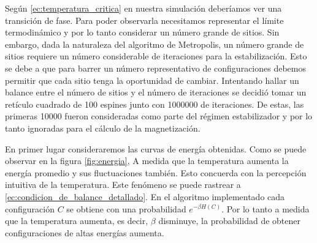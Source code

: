 \documentclass{article}
\begin{document}
Según \eqref{ec:temperatura_critica} en nuestra simulación deberíamos ver una transición de fase. Para poder observarla necesitamos representar el límite termodinámico y por lo tanto considerar un número grande de sitios. Sin embargo, dada la naturaleza del algoritmo de Metropolis, un número grande de sitios requiere un número considerable de iteraciones para la estabilización. Esto se debe a que para barrer un número representativo de configuraciones debemos permitir que cada sitio tenga la oportunidad de cambiar. Intentando hallar un balance entre el número de sitios y el número de iteraciones se decidió tomar un retículo cuadrado de 100 espines junto con 1000000 de iteraciones. De estas, las primeras 10000 fueron consideradas como parte del régimen estabilizador y por lo tanto ignoradas para el cálculo de la magnetización.

En primer lugar consideraremos las curvas de energía obtenidas. Como se puede observar en la figura \ref{fig:energia}, A medida que la temperatura aumenta la energía promedio y sus fluctuaciones también. Esto concuerda con la percepción intuitiva de la temperatura. Este fenómeno se puede rastrear a \eqref{ec:condicion_de_balance_detallado}. En el algoritmo implementado cada configuración $C$ se obtiene con una probabilidad $e^{-\beta H(C)}$. Por lo tanto a medida que la temperatura aumenta, es decir, $\beta$ disminuye, la probabilidad de obtener configuraciones de altas energías aumenta.
\end{document}
